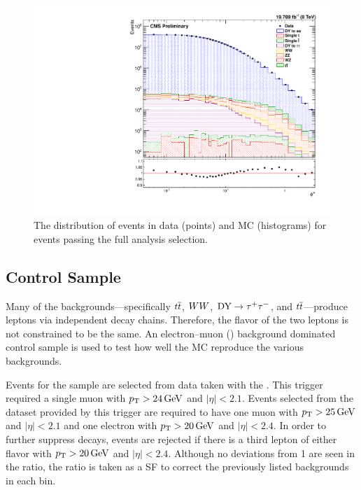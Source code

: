 \begin{figure}[!htbp]
    \centering
    \includegraphics[width=\textwidth]{figures/phistar.pdf}
    \caption{
        The \phistar distribution of events in data (points) and MC
        (histograms) for events passing the full analysis selection.
    }
    \label{fig:phistar_background}
\end{figure}

\subsection{\emu Control Sample}

Many of the backgrounds---specifically $t\overline{t}$, $WW$, $\text{DY} \to \tau^{+} \tau^{-}$, and
$t\overline{t}$---produce leptons via independent decay chains. Therefore, the flavor
of the two leptons is not constrained to be the same. An electron--muon
(\emu) background dominated control sample is used to test how well the MC
reproduce the various backgrounds.

Events for the \emu sample are selected from data taken with the
\SingleMuonTrigger. This trigger required a single muon with $p_{\mathrm{T}} > 24 \,\text{Ge\hspace{-.08em}V}$
and $|\eta| < 2.1$. Events selected from the dataset provided by this trigger
are required to have one muon with $p_{\mathrm{T}} > 25 \,\text{Ge\hspace{-.08em}V}$ and $|\eta| < 2.1$ and one
electron with $p_{\mathrm{T}} > 20 \,\text{Ge\hspace{-.08em}V}$ and $|\eta| < 2.4$. In order to further suppress
\Z decays, events are rejected if there is a third lepton of either flavor with
$p_{\mathrm{T}} > 20 \,\text{Ge\hspace{-.08em}V}$ and $|\eta| < 2.4$.  Although no
deviations from \num{1} are seen in the ratio, the ratio is taken as a SF to
correct the previously listed backgrounds in each bin.

